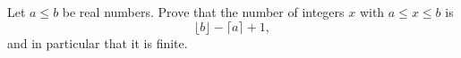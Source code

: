 Let $a\le b$ be real numbers. Prove that the number of integers $x$ with $a\le x\le b$ is
\[\lfloor b\rfloor-\lceil a\rceil+1,\]
and in particular that it is finite.
